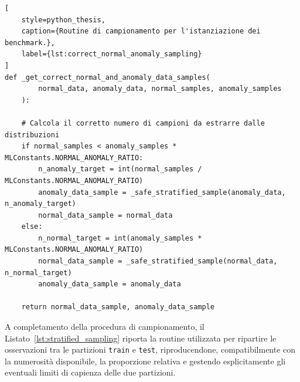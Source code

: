 \newpage

\begin{lstlisting}[
    style=python_thesis,
    caption={Routine di campionamento per l'istanziazione dei benchmark.},
    label={lst:correct_normal_anomaly_sampling}
]
def _get_correct_normal_and_anomaly_data_samples(
        normal_data, anomaly_data, normal_samples, anomaly_samples
    ):

    # Calcola il corretto numero di campioni da estrarre dalle distribuzioni
    if normal_samples < anomaly_samples * MLConstants.NORMAL_ANOMALY_RATIO:
        n_anomaly_target = int(normal_samples / MLConstants.NORMAL_ANOMALY_RATIO)
        anomaly_data_sample = _safe_stratified_sample(anomaly_data, n_anomaly_target)
        normal_data_sample = normal_data
    else:
        n_normal_target = int(anomaly_samples * MLConstants.NORMAL_ANOMALY_RATIO)
        normal_data_sample = _safe_stratified_sample(normal_data, n_normal_target)
        anomaly_data_sample = anomaly_data

    return normal_data_sample, anomaly_data_sample
\end{lstlisting}

A completamento della procedura di campionamento, il Listato~\ref{lst:stratified_sampling} riporta la routine utilizzata per ripartire le osservazioni tra le partizioni \texttt{train} e \texttt{test}, riproducendone, compatibilmente con la numerosità disponibile, la proporzione relativa e gestendo esplicitamente gli eventuali limiti di capienza delle due partizioni.

